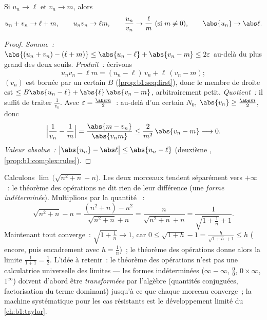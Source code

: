 \begin{theorem}\label{thm:b1:seq:operations}
Si $u_n \to \ell$ et $v_n \to m$, alors
\[
u_n + v_n \to \ell + m, \qquad u_n v_n \to \ell m, \qquad
\frac{u_n}{v_n} \to \frac{\ell}{m} \ (\text{si } m \neq 0),
\qquad \abs{u_n} \to \abs\ell .
\]
\end{theorem}

\begin{proof}
\emph{Somme~:} $\abs{(u_n + v_n) - (\ell + m)} \leq \abs{u_n - \ell} +
\abs{v_n - m} \leq 2\varepsilon$ au-delà du plus grand des deux
seuils. \emph{Produit~:} écrivons
\[
u_n v_n - \ell m = (u_n - \ell)\,v_n + \ell\,(v_n - m);
\]
$(v_n)$ est bornée par un certain $B$ (\cref{prop:b1:seq:first}),
donc le membre de droite est $\leq B\abs{u_n - \ell} +
\abs{\ell}\,\abs{v_n - m}$, arbitrairement petit. \emph{Quotient~:} il
suffit de traiter $\frac 1{v_n}$. Avec $\varepsilon = \frac{\abs
m}{2}$~: au-delà d'un certain $N_0$, $\abs{v_n} \geq \frac{\abs
m}{2}$, donc
\[
\Bigl| \frac{1}{v_n} - \frac 1m \Bigr|
= \frac{\abs{m - v_n}}{\abs{v_n m}}
\leq \frac{2}{m^2}\,\abs{v_n - m} \longrightarrow 0 .
\]
\emph{Valeur absolue~:} $\bigl|\abs{u_n} - \abs\ell\bigr| \leq
\abs{u_n - \ell}$ (deuxième ,
\cref{prop:b1:complex:rules}).
\end{proof}

\begin{example}\label{ex:b1:seq:conjugatetrick}
Calculons $\lim\,\bigl(\sqrt{n^2 + n} - n\bigr)$. Les deux morceaux
tendent séparément vers $+\infty$~: le théorème des opérations ne dit
rien de leur différence (une \emph{forme indéterminée}). Multiplions
par la quantité ~:
\[
\sqrt{n^2 + n} - n
= \frac{(n^2 + n) - n^2}{\sqrt{n^2 + n} + n}
= \frac{n}{\sqrt{n^2+n} + n}
= \frac{1}{\sqrt{1 + \frac1n} + 1} .
\]
Maintenant tout converge~: $\sqrt{1 + \frac1n} \to 1$, car
$0 \leq \sqrt{1 + h} - 1 = \frac{h}{\sqrt{1+h} + 1} \leq h$
( encore, puis encadrement avec $h = \frac1n$)~; le
théorème des opérations donne alors la limite $\frac{1}{1 + 1} =
\frac12$. L'idée à retenir~: le théorème des opérations n'est pas une
calculatrice universelle des limites --- les formes indéterminées
($\infty - \infty$, $\frac00$, $0 \times \infty$, $1^\infty$) doivent
d'abord être \emph{transformées} par l'algèbre (quantités conjuguées,
factorisation du terme dominant) jusqu'à ce que chaque morceau
converge~; la machine systématique pour les cas résistants est le
développement limité du \cref{ch:b1:taylor}.
\end{example}

